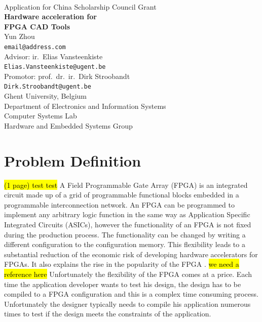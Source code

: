 \documentclass[a4paper,oneside,12pt]{article}
\begin{document}

\thispagestyle{empty}

\begin{center}
\mbox{}\\\vspace{5mm}
{\Large Application for China Scholarship Council Grant}\\ [45mm]
%
{\bf\Huge Hardware acceleration for\\
[3mm] FPGA CAD Tools} \\
\vspace{45mm}
\Large Yun Zhou \\
\vspace{2mm}
\small\texttt{email@address.com} \\
\vspace{20mm}
\Large Advisor: ir.\ Elias Vansteenkiste \\
\small\texttt{Elias.Vansteenkiste@ugent.be} \\
\vspace{2mm}
\Large Promotor: prof.\ dr.\ ir.\ Dirk Stroobandt \\
\small\texttt{Dirk.Stroobandt@ugent.be} \\
\vspace{20mm}
\normalsize Ghent University, Belgium \\
\normalsize Department of Electronics and Information Systems\\
\normalsize Computer Systems Lab\\
\normalsize Hardware and Embedded Systems Group 
\end{center}

\newpage

\tableofcontents

\clearpage

\section{Problem Definition}
\hl{(1 page) test test}
A Field Programmable Gate Array (FPGA) is an integrated circuit made up of a grid of programmable functional blocks embedded in a programmable interconnection network. An FPGA can be programmed to implement any arbitrary logic function in the same way as Application Specific Integrated Circuits (ASICs), however the functionality of an FPGA is not fixed during the production process. The functionality can be changed by writing a different configuration to the configuration memory. This flexibility leads to a substantial reduction of the economic risk of developing hardware accelerators for FPGAs. It also explains the rise in the popularity of the FPGA \cite{}. \hl{we need a reference here} Unfortunately the flexibility of the FPGA comes at a price.  Each time the application developer wants to test his design, the design has to be compiled to a FPGA configuration and this is a complex time consuming process. Unfortunately the designer typically needs to compile his application numerous times to test if the design meets the constraints of the application. 
\end{document}
